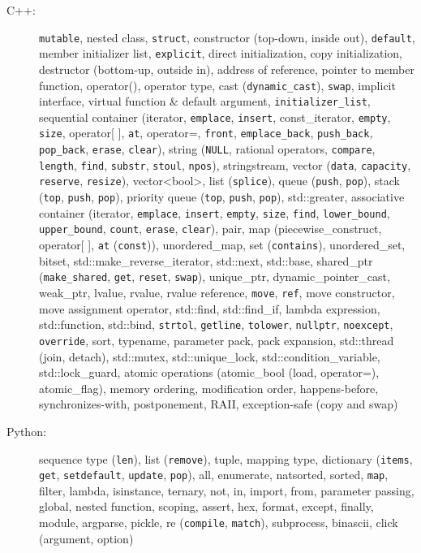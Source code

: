 \documentclass[letterpaper,11pt]{article}
\begin{document}
\begin{CJK}{UTF8}{gbsn}
\begin{description}
\item[C++:] {\tt mutable}, nested class,
{\tt struct}, constructor (top-down, inside out), {\tt default}, member initializer list, {\tt explicit}, direct initialization, copy initialization,
destructor (bottom-up, outside in), address of reference, pointer to member function, operator(), operator type,
cast ({\tt dynamic\_cast}), {\tt swap},
implicit interface, virtual function \& default argument, {\tt initializer\_list},
%
sequential container (iterator, {\tt emplace}, {\tt insert}, const\_iterator,
{\tt empty}, {\tt size}, operator[ ], {\tt at}, operator=, {\tt front}, {\tt emplace\_back},
{\tt push\_back}, {\tt pop\_back}, {\tt erase}, {\tt clear}),
%
string ({\tt NULL}, rational operators, {\tt compare}, {\tt length}, {\tt find}, {\tt substr}, {\tt stoul}, {\tt npos}), stringstream,
%
vector ({\tt data}, {\tt capacity}, {\tt reserve}, {\tt resize}), vector\textless bool\textgreater,
list ({\tt splice}),
queue ({\tt push}, {\tt pop}), stack ({\tt top}, {\tt push}, {\tt pop}),
priority queue ({\tt top}, {\tt push}, {\tt pop}), std::greater,
%
associative container (iterator, {\tt emplace}, {\tt insert}, {\tt empty}, {\tt size},
{\tt find}, {\tt lower\_bound}, {\tt upper\_bound},
{\tt count}, {\tt erase}, {\tt clear}),
%
pair, map (piecewise\_construct, operator[ ], {\tt at} ({\tt const})), unordered\_map, set ({\tt contains}), unordered\_set,
%
bitset,
%
std::make\_reverse\_iterator, std::next, std::base,
%
shared\_ptr ({\tt make\_shared}, {\tt get}, {\tt reset}, {\tt swap}), unique\_ptr, dynamic\_pointer\_cast, weak\_ptr,
%
lvalue, rvalue, rvalue reference, {\tt move}, {\tt ref}, move constructor, move assignment operator,
%
std::find, std::find\_if, lambda expression, std::function, std::bind, {\tt strtol}, {\tt getline}, {\tt tolower},
{\tt nullptr}, {\tt noexcept}, {\tt override},
sort,
%
typename, parameter pack, pack expansion,
%
std::thread (join, detach),
std::mutex, std::unique\_lock, std::condition\_variable, std::lock\_guard,
atomic operations (atomic\_bool (load, operator=), atomic\_flag), memory ordering, modification order, happens-before, synchronizes-with,
%
postponement, RAII, exception-safe (copy and swap)

\item[Python:] sequence type ({\tt len}), list ({\tt remove}), tuple, mapping type,
dictionary ({\tt items}, {\tt get}, {\tt setdefault}, {\tt update}, {\tt pop}),
all,
enumerate, natsorted, sorted, {\tt map}, filter, lambda, isinstance, ternary, not, in, import, from, parameter passing,
global, nested function, scoping, assert, hex, format,
except, finally, module, argparse, pickle, re ({\tt compile}, {\tt match}), subprocess, binascii, click (argument, option)


\end{description}
\end{CJK}
\end{document}
